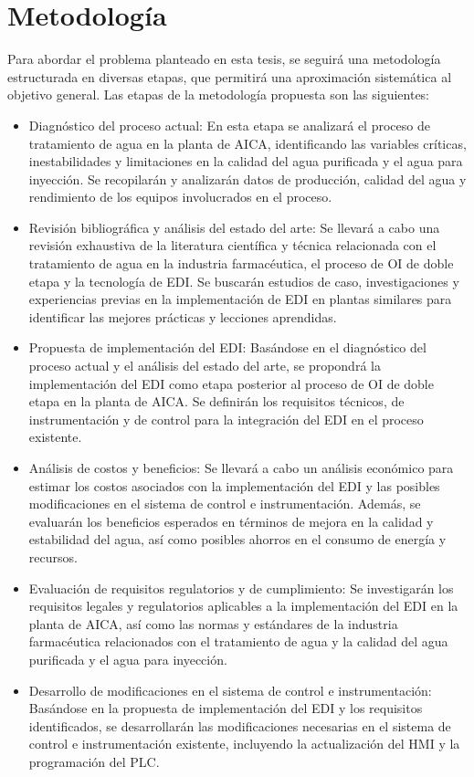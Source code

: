\section*{Metodología}
Para abordar el problema planteado en esta tesis, se seguirá una metodología estructurada en diversas etapas, que permitirá una aproximación sistemática al objetivo general. Las etapas de la metodología propuesta son las siguientes:
\begin{itemize}
    \item Diagnóstico del proceso actual: En esta etapa se analizará el proceso de tratamiento de agua en la planta de AICA, identificando las variables críticas, inestabilidades y limitaciones en la calidad del agua purificada y el agua para inyección. Se recopilarán y analizarán datos de producción, calidad del agua y rendimiento de los equipos involucrados en el proceso.
    \item Revisión bibliográfica y análisis del estado del arte: Se llevará a cabo una revisión exhaustiva de la literatura científica y técnica relacionada con el tratamiento de agua en la industria farmacéutica, el proceso de OI de doble etapa y la tecnología de EDI. Se buscarán estudios de caso, investigaciones y experiencias previas en la implementación de EDI en plantas similares para identificar las mejores prácticas y lecciones aprendidas.
    \item Propuesta de implementación del EDI: Basándose en el diagnóstico del proceso actual y el análisis del estado del arte, se propondrá la implementación del EDI como etapa posterior al proceso de OI de doble etapa en la planta de AICA. Se definirán los requisitos técnicos, de instrumentación y de control para la integración del EDI en el proceso existente.
    \item Análisis de costos y beneficios: Se llevará a cabo un análisis económico para estimar los costos asociados con la implementación del EDI y las posibles modificaciones en el sistema de control e instrumentación. Además, se evaluarán los beneficios esperados en términos de mejora en la calidad y estabilidad del agua, así como posibles ahorros en el consumo de energía y recursos.
    \item Evaluación de requisitos regulatorios y de cumplimiento: Se investigarán los requisitos legales y regulatorios aplicables a la implementación del EDI en la planta de AICA, así como las normas y estándares de la industria farmacéutica relacionados con el tratamiento de agua y la calidad del agua purificada y el agua para inyección.
    \item Desarrollo de modificaciones en el sistema de control e instrumentación: Basándose en la propuesta de implementación del EDI y los requisitos identificados, se desarrollarán las modificaciones necesarias en el sistema de control e instrumentación existente, incluyendo la actualización del HMI y la programación del PLC.
\end{itemize}






